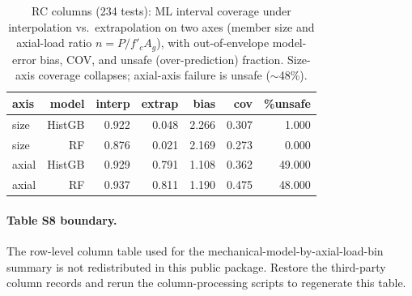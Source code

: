 \documentclass[11pt]{article}
\begin{document}
\begin{table}[h]\centering\small
\caption{RC columns (234 tests): ML interval coverage under interpolation vs.\ extrapolation on two axes (member size and axial-load ratio $n=P/f'_c A_g$), with out-of-envelope model-error bias, COV, and unsafe (over-prediction) fraction. Size-axis coverage collapses; axial-axis failure is unsafe ($\sim$48\%).}\label{tab:s7}
\begin{tabular}{lrrrrrr}
\toprule
\textbf{axis} & \textbf{model} & \textbf{interp} & \textbf{extrap} & \textbf{bias} & \textbf{cov} & \textbf{\%unsafe} \\
\midrule
size & HistGB & 0.922 & 0.048 & 2.266 & 0.307 & 1.000 \\
size & RF & 0.876 & 0.021 & 2.169 & 0.273 & 0.000 \\
axial & HistGB & 0.929 & 0.791 & 1.108 & 0.362 & 49.000 \\
axial & RF & 0.937 & 0.811 & 1.190 & 0.475 & 48.000 \\
\bottomrule
\end{tabular}
\end{table}

\paragraph{Table S8 boundary.} The row-level column table used for the mechanical-model-by-axial-load-bin summary is not redistributed in this public package. Restore the third-party column records and rerun the column-processing scripts to regenerate this table.
\end{document}
